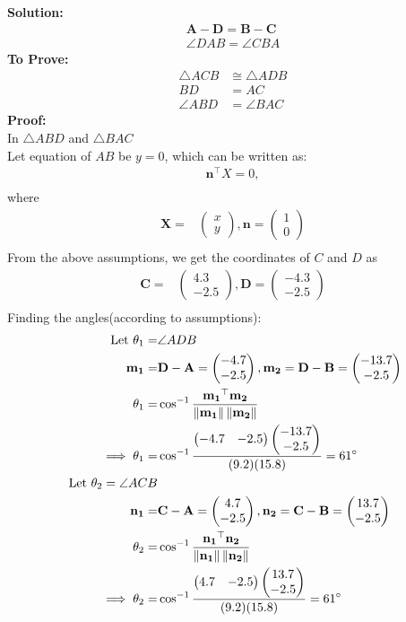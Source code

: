 \documentclass{article}
\providecommand{\norm}[1]{\left\lVert#1\right\rVert}
\newcommand{\solution}{\noindent \textbf{Solution: }}
\newcommand{\myvec}[1]{\ensuremath{\begin{pmatrix}#1\end{pmatrix}}}
\let\vec\mathbf
\begin{document}
\solution
\begin{align}
	\vec{A}-\vec{D} = \vec{B}-\vec{C}\\
  \angle{DAB} = \angle{CBA}
\end{align}
\textbf{To Prove:}
  \begin{align}
	  \triangle{ACB} &\cong \triangle{ADB}\\
	  BD &= AC\\
	  \angle{ABD} &= \angle{BAC}
  \end{align}
\textbf{Proof:}\\
In $\triangle{ABD}$ and $\triangle{BAC}$\\
Let  equation of $AB$ be $y = 0$, which can be written as:
\begin{align}
\vec{n}^{\top}X = 0,\\
\end{align}
where
\begin{align}
\vec{X} =& \myvec{x\\y},\vec{n} = \myvec{1\\0}\\
\end{align}
  From the above assumptions, we get the coordinates of $C$ and $D$ as
  \begin{align}
\vec{C} =& \myvec{4.3\\-2.5},\vec{D} = \myvec{-4.3\\-2.5}\\
  \end{align}
    Finding the angles(according to assumptions):
    \begin{align}
\text{Let }\theta_1=&\angle ADB\\
\vec{m_1}=&\vec{D}-\vec{A}=\myvec{-4.7\\-2.5}, \vec{m_2}=\vec{D}-\vec{B}=\myvec{-13.7\\-2.5}\\
\theta_1=&\cos^{-1}\frac{\vec{m_1}^\top\vec{m_2}}{\norm{\vec{m_1}}\norm{\vec{m_2}}}\\
\implies\theta_1=&\cos^{-1}\frac{\myvec{-4.7&-2.5}\myvec{-13.7\\-2.5}}{(9.2)(15.8)}=61\degree 
\label{eq:1}\\
\text{ Let }\theta_2=\angle ACB\\
\vec{n_1}=&\vec{C}-\vec{A}=\myvec{4.7\\-2.5}, \vec{n_2}=\vec{C}-\vec{B}=\myvec{13.7\\-2.5}\\
\theta_2 =& \cos^{-1}\frac{\vec{n_1}^\top\vec{n_2}}{\norm{\vec{n_1}}\norm{\vec{n_2}}}\\
\implies\theta_2=&\cos^{-1}\frac{\myvec{4.7&-2.5}\myvec{13.7\\-2.5}}{(9.2)(15.8)}=61\degree 
\label{eq:2}
\end{align}
\end{document}
